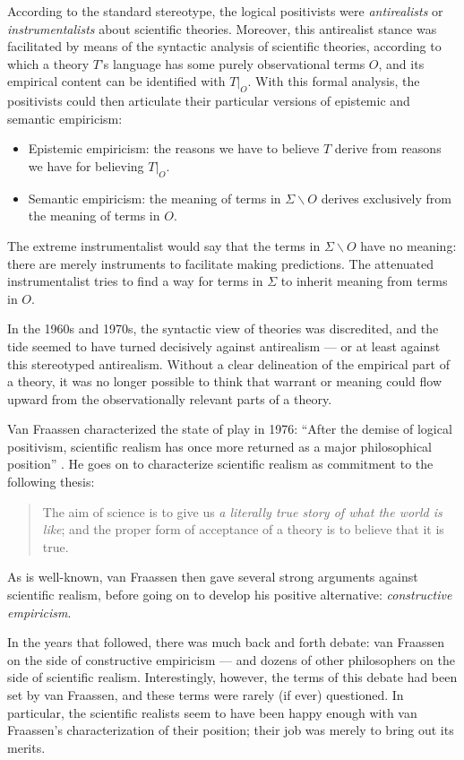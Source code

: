 According to the standard stereotype, the logical positivists were
{\it antirealists} or {\it instrumentalists} about scientific
theories.  Moreover, this antirealist stance was facilitated by means
of the syntactic analysis of scientific theories, according to which a
theory $T$'s language has some purely observational terms $O$, and its
empirical content can be identified with $T|_O$.  With this formal
analysis, the positivists could then articulate their particular
versions of epistemic and semantic empiricism:
\begin{itemize}
\item Epistemic empiricism: the reasons we have to believe $T$ derive
  from reasons we have for believing $T|_O$.
\item Semantic empiricism: the meaning of terms in
  $\Sigma\backslash O$ derives exclusively from the meaning of terms
  in $O$.
\end{itemize}
The extreme instrumentalist would say that the terms in
$\Sigma\backslash O$ have no meaning: there are merely instruments to
facilitate making predictions.  The attenuated instrumentalist tries
to find a way for terms in $\Sigma$ to inherit meaning from terms in
$O$.

In the 1960s and 1970s, the syntactic view of theories was
discredited, and the tide seemed to have turned decisively against
antirealism --- or at least against this stereotyped antirealism.
Without a clear delineation of the empirical part of a theory, it was
no longer possible to think that warrant or meaning could flow upward
from the observationally relevant parts of a theory.

Van Fraassen characterized the state of play in 1976: ``After the
demise of logical positivism, scientific realism has once more
returned as a major philosophical position'' \citep[623]{bas1976}.  He
goes on to characterize scientific realism as commitment to the
following thesis:
\begin{quote}
  The aim of science is to give us {\it a literally true story of what
    the world is like}; and the proper form of acceptance of a theory
  is to believe that it is true.  \citep[623]{bas1976} \end{quote} As
is well-known, van Fraassen then gave several strong arguments against
scientific realism, before going on to develop his positive
alternative: {\it constructive empiricism}.

In the years that followed, there was much back and forth debate: van
Fraassen on the side of constructive empiricism --- and dozens of
other philosophers on the side of scientific realism.  Interestingly,
however, the terms of this debate had been set by van Fraassen, and
these terms were rarely (if ever) questioned.  In particular, the
scientific realists seem to have been happy enough with van Fraassen's
characterization of their position; their job was merely to bring out
its merits.

